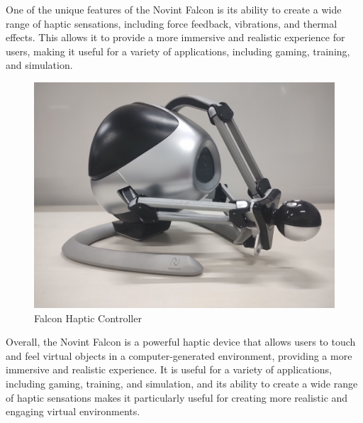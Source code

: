 \documentclass[letterpaper, 10 pt, conference]{ieeeconf}
\begin{document}
One of the unique features of the Novint Falcon is its ability to create a wide range of haptic sensations, including force feedback, vibrations, and thermal effects. This allows it to provide a more immersive and realistic experience for users, making it useful for a variety of applications, including gaming, training, and simulation.
\begin{figure}[!ht]
    \centering
    \includegraphics[scale=0.05]{falcon.jpg} %
    \caption{Falcon Haptic Controller}
    \label{Fig:Falcon Haptic Controller}
\end{figure}
Overall, the Novint Falcon is a powerful haptic device that allows users to touch and feel virtual objects in a computer-generated environment, providing a more immersive and realistic experience. It is useful for a variety of applications, including gaming, training, and simulation, and its ability to create a wide range of haptic sensations makes it particularly useful for creating more realistic and engaging virtual environments.
\end{document}
